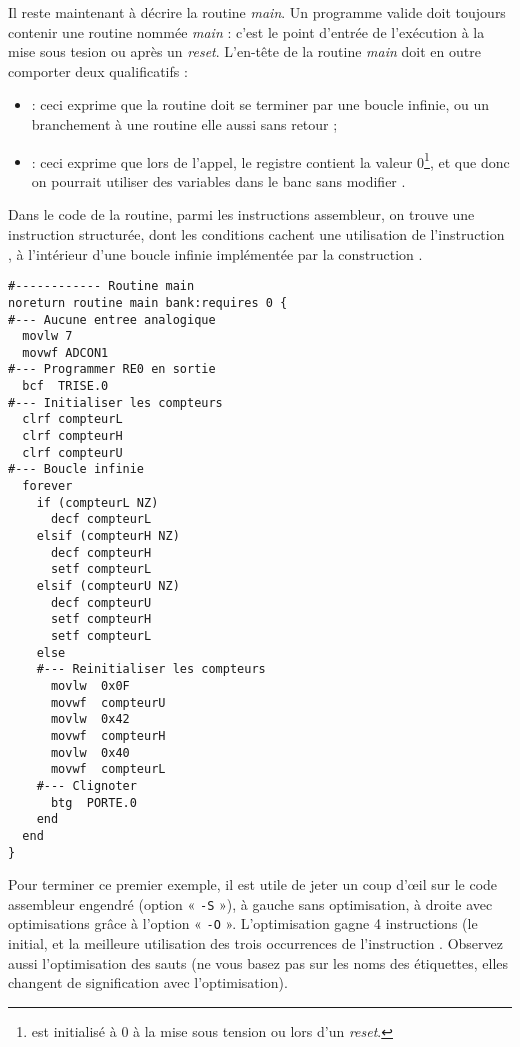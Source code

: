 Il reste maintenant à décrire la routine \emph{main}. Un programme valide doit toujours contenir une routine nommée \emph{main} : c'est le point d'entrée de l'exécution à la mise sous tesion ou après un \emph{reset}. L'en-tête de la routine \emph{main} doit en outre comporter deux qualificatifs :
\begin{itemize}
  \item {} : ceci exprime que la routine doit se terminer par une boucle infinie, ou un branchement à une routine elle aussi sans retour ;
  \item {} : ceci exprime que lors de l'appel, le registre  contient la valeur 0\footnote{ est initialisé à 0 à la mise sous tension ou lors d'un \emph{reset}.}, et que donc on pourrait utiliser des variables dans le banc  sans modifier .
\end{itemize}

Dans le code de la routine, parmi les instructions assembleur, on trouve une instruction  structurée, dont les conditions cachent une utilisation de l’instruction , à l'intérieur d'une boucle infinie implémentée par la construction .

\begin{lstlisting}[language=piccolo]
#------------ Routine main
noreturn routine main bank:requires 0 {
#--- Aucune entree analogique
  movlw 7
  movwf ADCON1
#--- Programmer RE0 en sortie
  bcf  TRISE.0
#--- Initialiser les compteurs
  clrf compteurL
  clrf compteurH
  clrf compteurU
#--- Boucle infinie
  forever
    if (compteurL NZ)
      decf compteurL
    elsif (compteurH NZ)
      decf compteurH
      setf compteurL
    elsif (compteurU NZ)
      decf compteurU
      setf compteurH
      setf compteurL
    else
    #--- Reinitialiser les compteurs
      movlw  0x0F
      movwf  compteurU
      movlw  0x42
      movwf  compteurH
      movlw  0x40
      movwf  compteurL
    #--- Clignoter
      btg  PORTE.0
    end
  end
}
\end{lstlisting}

Pour terminer ce premier exemple, il est utile de jeter un coup d’œil sur le code assembleur engendré (option « \texttt{-S} »), à gauche sans optimisation, à droite avec optimisations grâce à l’option « \texttt{-O} ». L’optimisation gagne 4 instructions (le  initial, et la meilleure utilisation des trois occurrences de l’instruction . Observez aussi l’optimisation des sauts (ne vous basez pas sur les noms des étiquettes, elles changent de signification avec l’optimisation).

